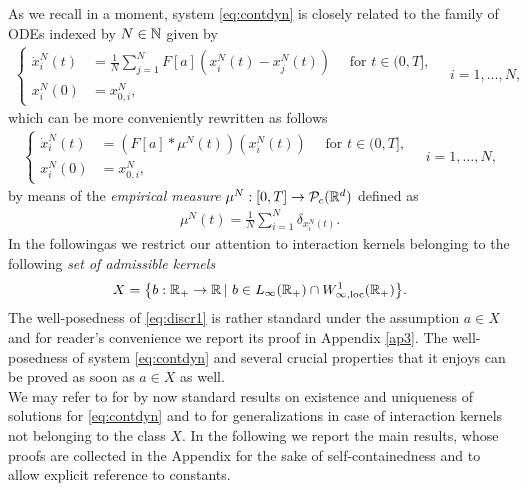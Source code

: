 As we recall in a moment, system \eqref{eq:contdyn} is closely related to the family of ODEs indexed by $N \in \mathbb{N}$ given by
\begin{align}\label{eq:discrdyn}
\left\{\begin{aligned}
\dot{x}^N_i(t) &= \frac{1}{N}\sum^N_{j = 1}F[a](x^N_i(t) - x^N_j(t)) \quad \text{ for } t \in (0,T],\\
x_i^N(0) &= x^N_{0,i},
\end{aligned} \quad i = 1, \ldots, N, \right.
\end{align}
which can be more conveniently rewritten as follows
\begin{align}\label{eq:discr1}
\left\{\begin{aligned}
\dot{x}^N_i(t) &= (F[a]*\mu^N(t))(x^N_i(t)) \quad \text{ for } t \in (0,T],\\
x^N_i(0) &= x^N_{0,i},
\end{aligned} \quad i = 1, \ldots, N, \right.
\end{align}
by means of the \textit{empirical measure} $\mu^N:[0,T]\rightarrow\mathcal{P}_c(\mathbb{R}^d)$ defined as
\begin{align}\label{eq:empmeas}
\mu^N(t) = \frac{1}{N}\sum^N_{i = 1} \delta_ {x^N_i(t)}.
\end{align}
In the followingas we restrict our attention to interaction kernels belonging to the following \textit{set of admissible kernels}
\begin{align*}
	X=\bigl\{b:\mathbb{R}_+\rightarrow\mathbb{R}\,|\ b \in L_{\infty}(\mathbb{R}_+) \cap W^{1}_{\infty,\textup{loc}}(\mathbb{R}_+) \bigr \}.
\end{align*}
The well-posedness of \eqref{eq:discr1} is rather standard under the assumption $a \in X$ and for reader's convenience we report its proof in Appendix \ref{ap3}. The well-posedness of system \eqref{eq:contdyn} and several crucial properties that it enjoys can be proved as soon as $a \in X$ as well.
\\
We may refer to \cite{AGS} for by now standard results on existence and uniqueness of solutions for \eqref{eq:contdyn} and to  \cite{13-Carrillo-Choi-Hauray-MFL} for generalizations in case of interaction kernels not belonging to the class $X$. In the following we report the main results, whose proofs are collected in the Appendix for the sake of self-containedness and to allow explicit reference to constants.
 



